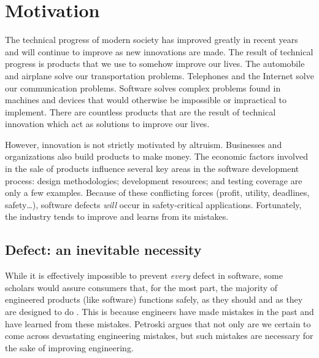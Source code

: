 \documentclass[12pt]{report}
\begin{document}
\chapter{Motivation}

The technical progress of modern society has improved greatly in recent years and will continue to improve as new innovations are made. The result of technical progress is products that we use to somehow improve our lives. The automobile and airplane solve our transportation problems. Telephones and the Internet solve our communication problems. Software solves complex problems found in machines and devices that would otherwise be impossible or impractical to implement. There are countless products that are the result of technical innovation which act as solutions to improve our lives.

However, innovation is not strictly motivated by altruism. Businesses and organizations also build products to make money. The economic factors involved in the sale of products influence several key areas in the software development process: design methodologies; development resources; and testing coverage are only a few examples. Because of these conflicting forces (profit, utility, deadlines, safety\ldots), software defects \textit{will} occur in safety-critical applications. Fortunately, the industry tends to improve and learns from its mistakes.

\section{Defect: an inevitable necessity}
While it is effectively impossible to prevent \textit{every} defect in software, some scholars would assure consumers that, for the most part, the majority of engineered products (like software) functions safely, as they should and as they are designed to do \cite{Petroski85}. This is because engineers have made mistakes in the past and have learned from these mistakes. Petroski argues that not only are we certain to come across devastating engineering mistakes, but such mistakes are necessary for the sake of improving engineering.
\end{document}
